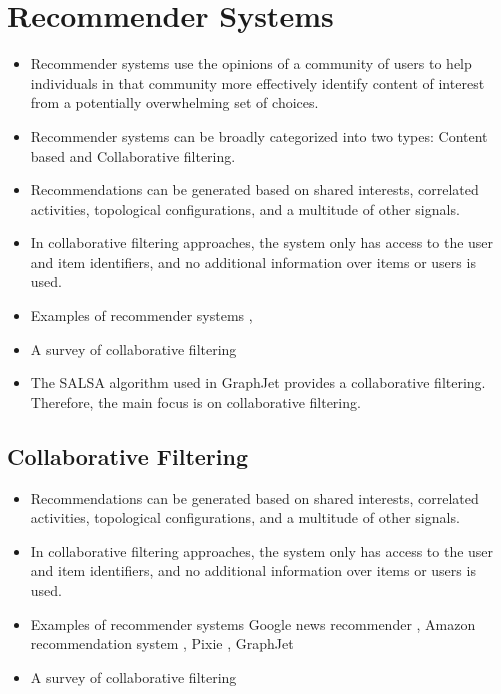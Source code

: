 \section{Recommender Systems}
\label{Grelgdnuan_vno_Bleototuh_Lwo_Egerny_BLE}

\begin{itemize}
	\item Recommender systems use the opinions of a community of users to help individuals in that community more effectively identify content of interest from a potentially overwhelming set of choices. \cite{resnick1997recommender}
	\item Recommender systems can be broadly categorized into two types: Content based and Collaborative filtering.
	\item Recommendations can be generated based on shared interests, correlated activities, topological configurations, and a multitude of other signals.
	\item In collaborative filtering approaches, the system only has access to the user and item identifiers, and no additional information over items or users is used.
	\item Examples of recommender systems \cite{das2007google}, \cite{linden2003amazon}
	\item A survey of collaborative filtering \cite{su2009survey}
	\item The SALSA algorithm used in GraphJet provides a collaborative filtering. Therefore, the main focus is on collaborative filtering.
	
\end{itemize}


\subsection{Collaborative Filtering}

\begin{itemize}
	\item Recommendations can be generated based on shared interests, correlated activities, topological configurations, and a multitude of other signals.
	\item In collaborative filtering approaches, the system only has access to the user and item identifiers, and no additional information over items or users is used.
	\item Examples of recommender systems Google news recommender \cite{das2007google}, Amazon recommendation system \cite{linden2003amazon}, Pixie \cite{eksombatchai2018pixie}, GraphJet \cite{sharma2016graphjet}
	\item A survey of collaborative filtering \cite{su2009survey} 
	
\end{itemize}



